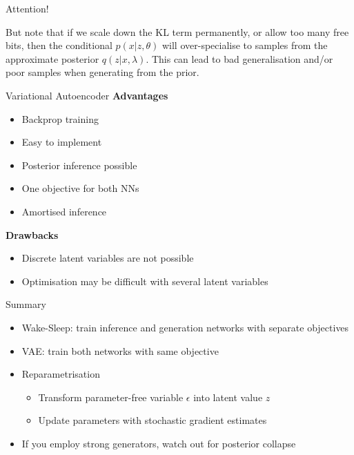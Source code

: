 \begin{frame}{Attention!}

But note that if we scale down the KL term permanently, or allow too many free bits, then the conditional $p(x|z, \theta)$ will over-specialise to samples from the approximate posterior $q(z|x, \lambda)$. 
This can lead to bad generalisation and/or poor samples when generating from the prior.

\end{frame}

\begin{frame}{Variational Autoencoder}
\textbf{Advantages}
\begin{itemize}
\item Backprop training
\item Easy to implement
\item Posterior inference possible
\item One objective for both NNs
\item Amortised inference
\end{itemize}
\pause
\textbf{Drawbacks}
\begin{itemize}
\item Discrete latent variables are not possible
\item Optimisation may be difficult with several latent variables
\end{itemize}
\end{frame}

\begin{frame}{Summary}
\begin{itemize}
\item Wake-Sleep: train inference and generation networks with separate objectives
\item VAE: train both networks with same objective
\item Reparametrisation
\begin{itemize}
\item  Transform parameter-free variable $ \epsilon $ into latent value $ z $
\item Update parameters with stochastic gradient estimates
\end{itemize}
\item If you employ strong generators, watch out for posterior collapse 
\end{itemize}
\end{frame}

